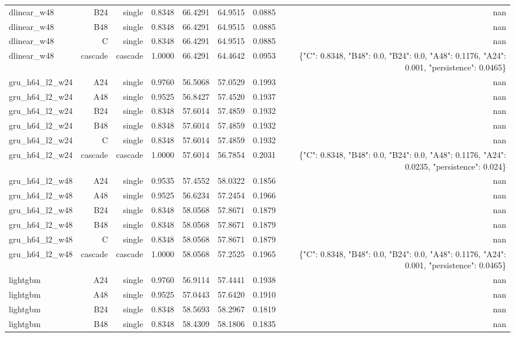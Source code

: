 \begin{table}[htbp]
\begin{tabular}{lrrrrrrr}
dlinear\_w48 & B24 & single & 0.8348 & 66.4291 & 64.9515 & 0.0885 & nan \\
dlinear\_w48 & B48 & single & 0.8348 & 66.4291 & 64.9515 & 0.0885 & nan \\
dlinear\_w48 & C & single & 0.8348 & 66.4291 & 64.9515 & 0.0885 & nan \\
dlinear\_w48 & cascade & cascade & 1.0000 & 66.4291 & 64.4642 & 0.0953 & \{"C": 0.8348, "B48": 0.0, "B24": 0.0, "A48": 0.1176, "A24": 0.001, "persistence": 0.0465\} \\
gru\_h64\_l2\_w24 & A24 & single & 0.9760 & 56.5068 & 57.0529 & 0.1993 & nan \\
gru\_h64\_l2\_w24 & A48 & single & 0.9525 & 56.8427 & 57.4520 & 0.1937 & nan \\
gru\_h64\_l2\_w24 & B24 & single & 0.8348 & 57.6014 & 57.4859 & 0.1932 & nan \\
gru\_h64\_l2\_w24 & B48 & single & 0.8348 & 57.6014 & 57.4859 & 0.1932 & nan \\
gru\_h64\_l2\_w24 & C & single & 0.8348 & 57.6014 & 57.4859 & 0.1932 & nan \\
gru\_h64\_l2\_w24 & cascade & cascade & 1.0000 & 57.6014 & 56.7854 & 0.2031 & \{"C": 0.8348, "B48": 0.0, "B24": 0.0, "A48": 0.1176, "A24": 0.0235, "persistence": 0.024\} \\
gru\_h64\_l2\_w48 & A24 & single & 0.9535 & 57.4552 & 58.0322 & 0.1856 & nan \\
gru\_h64\_l2\_w48 & A48 & single & 0.9525 & 56.6234 & 57.2454 & 0.1966 & nan \\
gru\_h64\_l2\_w48 & B24 & single & 0.8348 & 58.0568 & 57.8671 & 0.1879 & nan \\
gru\_h64\_l2\_w48 & B48 & single & 0.8348 & 58.0568 & 57.8671 & 0.1879 & nan \\
gru\_h64\_l2\_w48 & C & single & 0.8348 & 58.0568 & 57.8671 & 0.1879 & nan \\
gru\_h64\_l2\_w48 & cascade & cascade & 1.0000 & 58.0568 & 57.2525 & 0.1965 & \{"C": 0.8348, "B48": 0.0, "B24": 0.0, "A48": 0.1176, "A24": 0.001, "persistence": 0.0465\} \\
lightgbm & A24 & single & 0.9760 & 56.9114 & 57.4441 & 0.1938 & nan \\
lightgbm & A48 & single & 0.9525 & 57.0443 & 57.6420 & 0.1910 & nan \\
lightgbm & B24 & single & 0.8348 & 58.5693 & 58.2967 & 0.1819 & nan \\
lightgbm & B48 & single & 0.8348 & 58.4309 & 58.1806 & 0.1835 & nan \\

\end{tabular}
\end{table}
